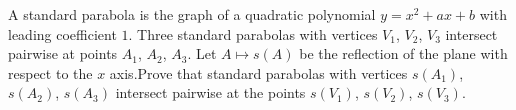 \documentclass{article}
\begin{document}
\setlength{\parindent}{0pt}
A standard parabola is the graph of a quadratic polynomial $y=x^{2}+ax+b$ with leading coefficient $1$. Three standard parabolas with vertices $V_{1}$, $V_{2}$, $V_{3}$ intersect pairwise at points $A_{1}$, $A_{2}$, $A_{3}$. Let $A\mapsto s(A)$ be the reflection of the plane with respect to the $x$ axis.\newline Prove that standard parabolas with vertices $s(A_{1})$, $s(A_{2})$, $s(A_{3})$ intersect pairwise at the points $s(V_{1})$, $s(V_{2})$, $s(V_{3})$.
\end{document}
